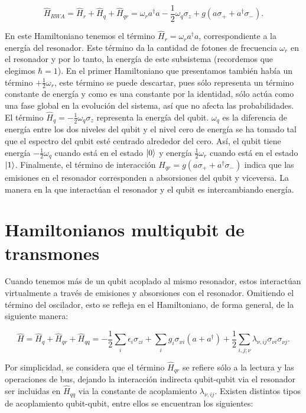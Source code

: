\begin{equation}
    \hat{H}_{RWA} = \hat{H}_r + \hat{H}_q + \hat{H}_{qr} = \omega_r a^\dag a - \frac{1}{2} \omega_q \sigma_z + g(a \sigma_+ + a^\dag \sigma_-) .
\end{equation}

En este Hamiltoniano tenemos el término $\hat{H}_r = \omega_r a^\dagger a$, correspondiente a la energía del resonador. Este término da la cantidad de fotones de frecuencia $\omega_r$ en el resonador y por lo tanto, la energía de este subsistema (recordemos que elegimos $\hbar = 1$). En el primer Hamiltoniano que presentamos también había un término $+ \frac{1}{2} \omega_r$, este término se puede descartar, pues sólo representa un término constante de energía y como es una constante por la identidad, sólo actúa como una fase global en la evolución del sistema, así que no afecta las probabilidades. El término $\hat{H}_q = - \frac{1}{2} \omega_q \sigma_z$ representa la energía del qubit. $\omega_q$ es la diferencia de energía entre los dos niveles del qubit y el nivel cero de energía se ha tomado tal que el espectro del qubit esté centrado alrededor del cero. Así, el qubit tiene energía $-\frac{1}{2} \omega_q$ cuando está en el estado $\ket{0}$ y energía $\frac{1}{2} \omega_r$ cuando está en el estado $\ket{1}$. Finalmente, el término de interacción $H_{qr} = g (a \sigma_+ + a^\dagger \sigma_-)$ indica que las emisiones en el resonador corresponden a absorsiones del qubit y viceversa. La manera en la que interactúan el resonador y el qubit es intercambiando energía.

\section{Hamiltonianos multiqubit de transmones}

Cuando tenemos más de un qubit acoplado al mismo resonador, estos interactúan virtualmente a través de emisiones y absorsiones con el resonador. Omitiendo el término del oscilador, esto se refleja en el Hamiltoniano, de forma general, de la siguiente manera:

\begin{equation}
\hat{H} = \hat{H}_q + \hat{H}_{qr} + \hat{H}_{qq} = -\frac{1}{2} \sum\limits_i \epsilon_i \sigma_{zi} + \sum\limits_i g_i \sigma_{xi} (a+a^\dag) + \frac{1}{2} \sum\limits_{i,j;\nu} \lambda_{\nu,ij} \sigma_{\nu i} \sigma_{\nu j} .
\end{equation}

Por simplicidad, se considera que el término $\hat{H}_{qr}$ se refiere sólo a la lectura y las operaciones de bus, dejando la interacción indirecta qubit-qubit via el resonador ser incluidas en $\hat{H}_{qq}$ via la constante de acoplamiento $\lambda_{\nu,ij}$. Existen distintos tipos de acoplamiento qubit-qubit, entre ellos se encuentran los siguientes:

